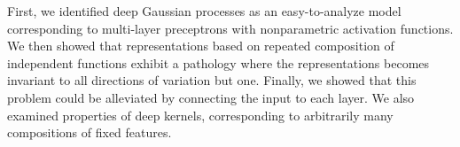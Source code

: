 First, we identified deep Gaussian processes as an easy-to-analyze model corresponding to multi-layer preceptrons with nonparametric activation functions.
%
We then showed that representations based on repeated composition of independent functions exhibit a pathology where the representations becomes invariant to all directions of variation but one. %
Finally, we showed that this problem could be alleviated by connecting the input to each layer.
%
We also examined properties of deep kernels, corresponding to arbitrarily many compositions of fixed features.





